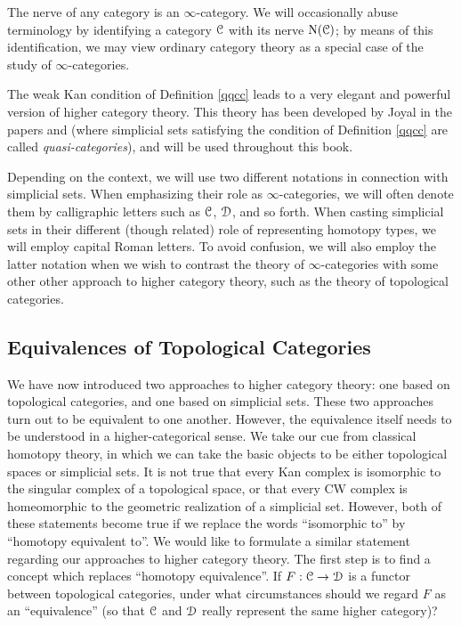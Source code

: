 \begin{example}
The nerve of any category is an $\infty$-category. We will occasionally abuse terminology by
identifying a category $\operatorname{\mathcal{C}}$ with its nerve $\operatorname{N}(\operatorname{\mathcal{C}})$; by means of this identification, we may view ordinary category theory as a special case of the study of $\infty$-categories.
\end{example}

The weak Kan condition of Definition \ref{qqcc} leads to a very elegant and powerful version of higher category theory. This theory has been developed by Joyal in the papers \cite{joyalpub} and
\cite{joyalnotpub} (where simplicial sets satisfying the condition of Definition \ref{qqcc} are called
{\it quasi-categories}), and will be used throughout this book.

\begin{notation}
Depending on the context, we will use two different notations in
connection with simplicial sets. When emphasizing their
role as $\infty$-categories, we will often denote
them by
calligraphic letters such as $\operatorname{\mathcal{C}}$, $\operatorname{\mathcal{D}}$, and so forth. When
casting simplicial sets in their different (though related) role
of representing homotopy types, we will employ capital Roman
letters. To avoid confusion, we will also employ the latter notation
when we wish to contrast the theory of $\infty$-categories with some
other other approach to higher category theory, such as the theory
of topological categories.
\end{notation}

\subsection{Equivalences of Topological Categories}\label{stronghcat}

We have now introduced two approaches to higher category theory: one based on topological categories, and one based on simplicial sets. These two approaches turn out to be equivalent to one another. However, the equivalence itself needs to be understood in a higher-categorical sense. We take our cue from classical homotopy theory, in which we can take the basic objects to be either topological spaces or simplicial sets. It is not true that every Kan complex is isomorphic to the singular complex of a topological space, or that every CW complex is homeomorphic to the geometric realization of a simplicial set. However, both of these statements become true if we replace the words ``isomorphic to'' by ``homotopy equivalent to''. We would like to formulate a similar statement regarding our approaches to higher category theory. The first step is to find a concept which replaces ``homotopy equivalence''. If $F: \operatorname{\mathcal{C}} \rightarrow \operatorname{\mathcal{D}}$ is a functor between topological categories, under what circumstances should we regard $F$ as an ``equivalence'' (so that $\operatorname{\mathcal{C}}$ and $\operatorname{\mathcal{D}}$ really represent the same higher category)? 

